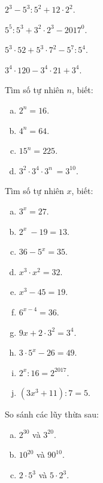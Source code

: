 \begin{bt}
\begin{listEX}[2]
\item  ${2^3} - {5^3}:{5^2} + 12 \cdot {2^2}$.
\item  ${5^5}:{5^3} + {3^2} \cdot {2^3} - {2017^0}$.
\item  ${5^3} \cdot 52 + {5^3} \cdot {7^2} - {5^7}:{5^4}$.
\item  ${3^4} \cdot 120 - {3^4} \cdot 21 + {3^4}$. 
\end{listEX}
\end{bt}   \begin{bt}
Tìm số tự nhiên $n$, biết:
\begin{multicols}{2}
\begin{enumerate}[a)]
\item  ${2^n} = 16$.
\item  ${4^n} = 64$.
\item  ${15^n} = 225$.
\item  ${3^2} \cdot {3^4} \cdot {3^{n\;}} = {3^{10}}$.
\end{enumerate} 
\end{multicols}
\end{bt}   \begin{bt}
 Tìm số tự nhiên $x$, biết:
 \begin{multicols}{2}
\begin{enumerate}[a)]
\item ${{3}^{x}}=27$.
\item ${{2}^{x}}~-19=13$. 
\item $36-{{5}^{x}}=35$.
\item ${{x}^{3}}\cdot {{x}^{2}}=32$.
\item ${{x}^{3}}-45=19$.
\item ${{6}^{x-4}}=36$.
\item $9x+2\cdot {{3}^{2}}={{3}^{4}}$.
\item $3\cdot {{5}^{x}}-26=49$.
\item ${{2}^{x}}:16={{2}^{2017}}$.
\item $(3{{x}^{3}}+11):7=5$.
\end{enumerate}
\end{multicols}
\end{bt}   \begin{bt}
So sánh các lũy thừa sau:
\begin{multicols}{2}
\begin{enumerate}[a)]
\item $2^{30}$ và $3^{20}$.
\item ${10}^{20}$  và  ${90}^{10}$.
\item $2 \cdot {5^3}$ và $5 \cdot {2^3}$.        

\end{enumerate}
\end{multicols}
\end{bt}

